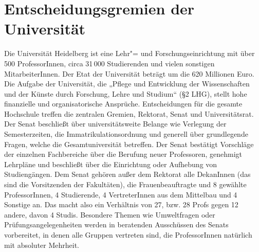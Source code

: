 \section{Entscheidungsgremien der Universität}

Die Universität Heidelberg ist eine Lehr"= und Forschungseinrichtung mit über
500 ProfessorInnen, circa 31\,000 Studierenden und vielen sonstigen
MitarbeiterInnen. Der Etat der Universität beträgt um die 620 Millionen Euro.
Die Aufgabe der Universität, die „Pflege und Entwicklung der Wissenschaften und
der Künste durch Forschung, Lehre und Studium“ (§2
LHG), stellt hohe finanzielle und organisatorische Ansprüche.  Entscheidungen
für die gesamte Hochschule treffen die zentralen Gremien, Rektorat, Senat und
Universitätsrat. Der Senat beschließt über universitätsweite Belange wie
Verlegung der Semesterzeiten, die Immatrikulationsordnung und generell über
grundlegende Fragen, welche die Gesamtuniversität betreffen. Der Senat
bestätigt Vorschläge der einzelnen Fachbereiche über die Berufung neuer
Professoren, genehmigt Lehrpläne und beschließt über die Einrichtung oder
Aufhebung von Studiengängen. Dem Senat gehören außer dem Rektorat alle
DekanInnen (das sind die Vorsitzenden der Fakultäten), die Frauenbeauftragte
und 8 gewählte ProfessorInnen, 4 Studierende, 4 VertreterInnen aus dem
Mittelbau und 4 Sonstige an. Das macht also ein Verhältnis von 27, bzw. 28
Profs gegen 12 andere, davon 4 Studis. Besondere Themen wie Umweltfragen oder
Prüfungsangelegenheiten werden in beratenden Ausschüssen des Senats
vorbereitet, in denen alle Gruppen vertreten sind, die ProfessorInnen natürlich
mit absoluter Mehrheit.



